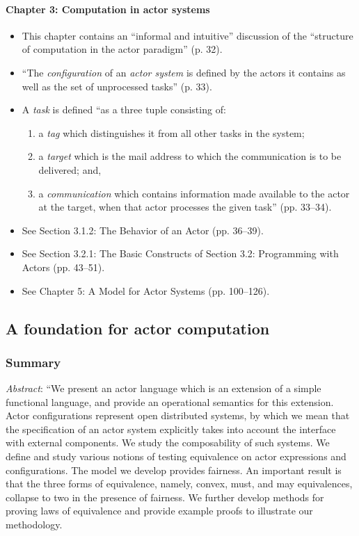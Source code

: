 \paragraph{Chapter 3: Computation in actor systems}
\begin{itemize}
\item This chapter contains an ``informal and intuitive'' discussion of the ``structure of computation in the actor paradigm'' (p. 32).
\item ``The \emph{configuration} of an \emph{actor system} is defined by the actors it contains as well as the set of unprocessed tasks'' (p. 33).
\item A \emph{task} is defined ``as a three tuple consisting of:
	\begin{enumerate}
	\item a \emph{tag} which distinguishes it from all other tasks in the system;
	\item a \emph{target} which is the mail address to which the communication is to be delivered; and,
	\item a \emph{communication} which contains information made available to the actor at the target, when that actor processes the given task'' (pp. 33--34).
	\end{enumerate}
\item See Section 3.1.2: The Behavior of an Actor (pp. 36--39).
\item See Section 3.2.1: The Basic Constructs of Section 3.2: Programming with Actors (pp. 43--51).
\item See Chapter 5: A Model for Actor Systems (pp. 100--126).
\end{itemize}



\subsection{A foundation for actor computation}
\subsubsection*{Summary}
\emph{Abstract}: ``We present an actor language which is an extension of a simple functional language, and provide an operational semantics for this extension. Actor configurations represent open distributed systems, by which we mean that the specification of an actor system explicitly takes into account the interface with external components. We study the composability of such systems. We define and study various notions of testing equivalence on actor expressions and configurations. The model we develop provides fairness. An important result is that the three forms of equivalence, namely, convex, must, and may equivalences, collapse to two in the presence of fairness. We further develop methods for proving laws of equivalence and provide example proofs to illustrate our methodology.
